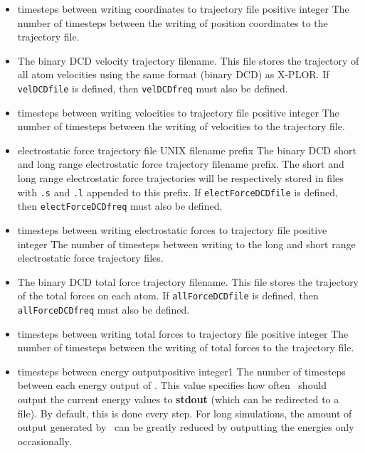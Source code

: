 \begin{itemize}
\item
{}%
{timesteps between writing coordinates to trajectory file}%
{positive integer}%
{%
The number of timesteps between the writing of position coordinates 
to the trajectory file.  
}

\item
{}
{
The binary DCD velocity trajectory filename.  
This file stores the trajectory of 
all atom velocities using the same format (binary DCD) as X-PLOR.  
If \verb!velDCDfile! is defined, then \verb!velDCDfreq! must also 
be defined.  
}

\item
{}%
{timesteps between writing velocities to trajectory file}%
{positive integer}%
{%
The number of timesteps between the writing of 
velocities to the trajectory file.  
}

\item
{}%
{electrostatic force trajectory file}%
{UNIX filename prefix}%
{%
The binary DCD short and long range electrostatic force 
trajectory filename prefix.  
The short and long range electrostatic force trajectories 
will be respectively stored in files with 
\verb!.s! and \verb!.l! appended to this prefix.  
If \verb!electForceDCDfile! is defined, then \verb!electForceDCDfreq! 
must also be defined.  
}

\item
{}%
{timesteps between writing electrostatic forces to trajectory file}%
{positive integer}%
{%
The number of timesteps between writing 
to the long and short range electrostatic force trajectory files.  
}

\item
{}
{%
The binary DCD total force trajectory filename.  
This file stores the trajectory of the total forces 
on each atom.  
If \verb!allForceDCDfile! is defined, then 
\verb!allForceDCDfreq! must also be defined.  
}

\item
{}%
{timesteps between writing total forces to trajectory file}%
{positive integer}%
{%
The number of timesteps between the writing of total forces 
to the trajectory file.  
}

\item
{}%
{timesteps between energy output}{positive integer}{1}%
{%
The number of timesteps between each energy output of \NAMD.  
This value
specifies how often \NAMD\ should output the current energy 
values to {\bf stdout} (which can be redirected to a file).  
By default, this is done every step.  
For long simulations, 
the amount of output generated by \NAMD\ can be greatly reduced 
by outputting the energies only occasionally.  
}


\end{itemize}
